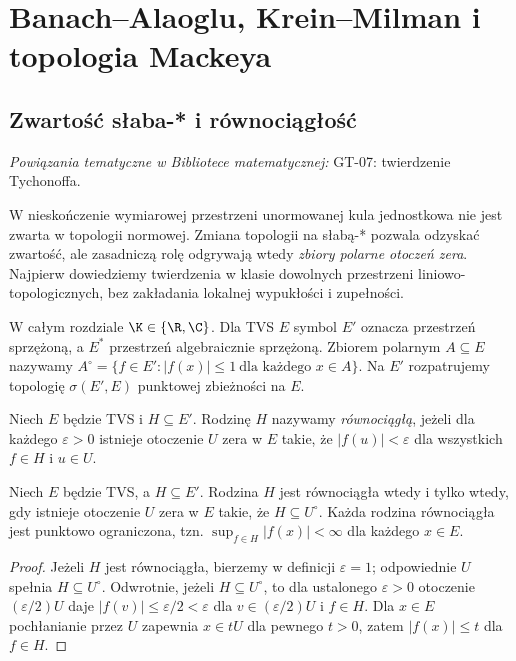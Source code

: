 \setcounter{section}{8}
\section{Banach--Alaoglu, Krein--Milman i topologia Mackeya}\label{sec:alaoglu-mackey}

\providecommand{\atlasref}[2]{#2}


\subsection{Zwartość słaba-* i równociągłość}

\noindent\emph{Powiązania tematyczne w Bibliotece matematycznej:} \atlasref{GT-07::thm:topog-tychonoff-iloczyny}{GT-07: twierdzenie Tychonoffa}.


W nieskończenie wymiarowej przestrzeni unormowanej kula jednostkowa nie jest zwarta
w topologii normowej. Zmiana topologii na słabą-* pozwala odzyskać zwartość,
ale zasadniczą rolę odgrywają wtedy \emph{zbiory polarne otoczeń zera}.
Najpierw dowiedziemy twierdzenia w klasie dowolnych przestrzeni
liniowo-topologicznych, bez zakładania lokalnej wypukłości i zupełności.

W całym rozdziale $\K\in\{\R,\C\}$. Dla TVS $E$ symbol $E'$ oznacza
przestrzeń sprzężoną, a $E^*$ przestrzeń algebraicznie sprzężoną.
Zbiorem polarnym $A\subseteq E$ nazywamy
$A^\circ=\{f\in E':|f(x)|\le1\ \text{dla każdego }x\in A\}$.
Na $E'$ rozpatrujemy topologię $\sigma(E',E)$ punktowej zbieżności na $E$.

\begin{definicja}\label{def:equicont-family}
Niech $E$ będzie TVS i $H\subseteq E'$. Rodzinę $H$ nazywamy
\emph{równociągłą}, jeżeli dla każdego $\varepsilon>0$ istnieje otoczenie
$U$ zera w $E$ takie, że $|f(u)|<\varepsilon$ dla wszystkich
$f\in H$ i $u\in U$.
\end{definicja}

\begin{stwierdzenie}\label{prop:equicont-polar}
Niech $E$ będzie TVS, a $H\subseteq E'$. Rodzina $H$ jest równociągła
wtedy i tylko wtedy, gdy istnieje otoczenie $U$ zera w $E$ takie,
że $H\subseteq U^\circ$. Każda rodzina równociągła jest punktowo
ograniczona, tzn. $\sup_{f\in H}|f(x)|<\infty$ dla każdego $x\in E$.
\end{stwierdzenie}
\begin{proof}
Jeżeli $H$ jest równociągła, bierzemy w definicji $\varepsilon=1$;
odpowiednie $U$ spełnia $H\subseteq U^\circ$. Odwrotnie,
jeżeli $H\subseteq U^\circ$, to dla ustalonego $\varepsilon>0$
otoczenie $(\varepsilon/2)U$ daje
$|f(v)|\le\varepsilon/2<\varepsilon$ dla $v\in(\varepsilon/2)U$
i $f\in H$. Dla $x\in E$ pochłanianie przez $U$ zapewnia
$x\in tU$ dla pewnego $t>0$, zatem $|f(x)|\le t$ dla $f\in H$.
\end{proof}

